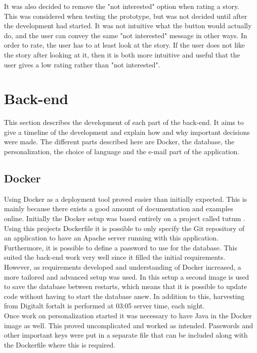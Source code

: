 It was also decided to remove the "not interested" option when rating a story. This was considered when testing the prototype, but was not decided until after the development had started. It was not intuitive what the button would actually do, and the user can convey the same "not interested" message in other ways. In order to rate, the user has to at least look at the story. If the user does not like the story after looking at it, then it is both more intuitive and useful that the user gives a low rating rather than "not interested". 





\section{Back-end}

This section describes the development of each part of the back-end. It aims to give a timeline of the development and explain how and why important decisions were made. The different parts described here are Docker, the database, the personalization, the choice of language and the e-mail part of the application.  

\subsection{Docker}

Using Docker as a deployment tool proved easier than initially expected. This is mainly because there exists a good amount of documentation and examples online. Initially the Docker setup was based entirely on a project called tutum \cite{EHW3}. Using this projects Dockerfile it is possible to only specify the Git repository of an application to have an Apache server running with this application. Furthermore, it is possible to define a password to use for the database. This suited the back-end work very well since it filled the initial requirements. However, as requirements developed and understanding of Docker increased, a more tailored and advanced setup was used. In this setup a second image is used to save the database between restarts, which means that it is possible to update code without having to start the database anew. In addition to this, harvesting from Digitalt fortalt is performed at 03:05 server time, each night. \\

Once work on personalization started it was necessary to have Java in the Docker image as well. This proved uncomplicated and worked as intended. Passwords and other important keys were put in a separate file that can be included along with the Dockerfile where this is required.

